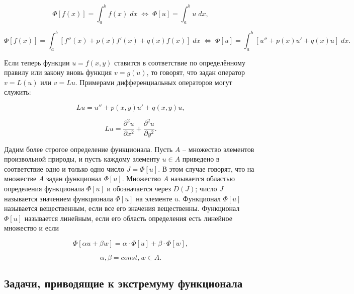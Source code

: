 \documentclass{article}
\begin{document}
\begin{displaymath}
	\Phi[f(x)] = \int_{a}^{b} f(x) \; dx \; \Leftrightarrow \; \Phi[u] = \int_{a}^{b} u \; dx,
\end{displaymath}

\begin{displaymath}
	\Phi[f(x)] = \int_{a}^{b} [f''(x) + p(x)f'(x) + q(x)f(x)] \;  dx \; \Leftrightarrow \; \Phi[u] = \int_{a}^{b} [u'' + p(x)u' + q(x)u] \;  dx. 
\end{displaymath}

Если теперь функции $u = f(x, y)$ ставится в соответствие по определённому правилу или закону вновь функция $v = g(u)$, то говорят, что задан оператор $v = L(u)$ или $v = Lu$. Примерами дифференциальных операторов могут служить:

\begin{displaymath}
	Lu = u'' + p(x,y)u' + q(x,y)u,
\end{displaymath}

\begin{displaymath}
    Lu = \frac{\partial^2 u}{\partial x^2} + \frac{\partial^2 u}{\partial y^2}.
\end{displaymath}

Дадим более строгое определение функционала. Пусть $A$ -- множество элементов произвольной природы, и пусть каждому элементу $u \in A$ приведено в соответствие одно и только одно число $J = \Phi[u]$. В этом случае говорят, что на множестве $A$ задан функционал $\Phi[u]$. Множество $A$ называется областью определения функционала $\Phi[u]$ и обозначается через $D(J)$; число $J$ называется значением функционала $\Phi[u]$ на элементе $u$. Функционал $\Phi[u]$ называется вещественным, если все его значения вещественны. Функционал $\Phi[u]$ называется линейным, если его область определения есть линейное множество и если

\begin{displaymath}
    \Phi[\alpha u + \beta w] = \alpha \cdot \Phi[u] + \beta \cdot \Phi[w],
\end{displaymath}

\begin{displaymath}
	\alpha, \beta = const, w \in A.
\end{displaymath}


\subsection{Задачи, приводящие к экстремуму функционала}
\end{document}

